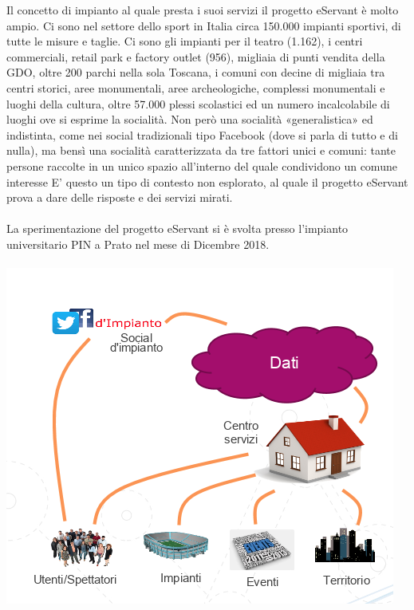 Il concetto di impianto al quale presta i suoi servizi il progetto eServant è molto ampio.
Ci sono nel settore dello sport in Italia circa 150.000 impianti sportivi, di tutte le misure e taglie. Ci sono gli impianti per il teatro (1.162), i centri commerciali, retail park e factory outlet (956), migliaia di punti vendita della GDO, oltre 200 parchi nella sola Toscana, i comuni con decine di migliaia tra centri storici, aree monumentali, aree archeologiche, complessi monumentali e luoghi della cultura, oltre 57.000 plessi scolastici ed un numero incalcolabile di luoghi ove si esprime la socialità.
Non però una socialità «generalistica» ed indistinta, come nei social tradizionali tipo Facebook (dove si parla di tutto e di nulla), ma bensì una socialità caratterizzata da tre fattori unici e comuni:
tante persone
raccolte in un unico spazio
all’interno del quale condividono un comune interesse
E’ questo un tipo di contesto non esplorato, al quale il progetto eServant prova a dare delle risposte e dei servizi mirati.
\paragraph{}

La sperimentazione del progetto eServant si è svolta presso l’impianto universitario PIN a Prato nel mese di Dicembre 2018.
\paragraph{}

\includegraphics[scale=0.8]{img/cap1/eservant}\\

